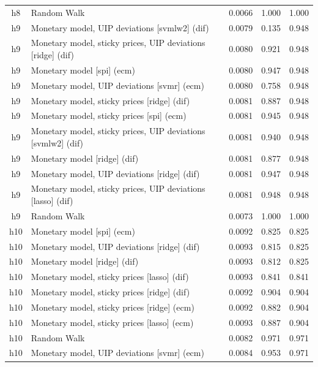 \begin{ThreePartTable}
\begin{longtable}[t]{cp{5.5cm}ccc}
h8 & \raggedright Random Walk & 0.0066 & 1.000 & 1.000\\
\addlinespace
h9 & \raggedright Monetary model, UIP deviations [svmlw2] (dif) & 0.0079 & 0.135 & 0.948\\
h9 & \raggedright Monetary model, sticky prices, UIP deviations [ridge] (dif) & 0.0080 & 0.921 & 0.948\\
h9 & \raggedright Monetary model [spi] (ecm) & 0.0080 & 0.947 & 0.948\\
h9 & \raggedright Monetary model, UIP deviations [svmr] (ecm) & 0.0080 & 0.758 & 0.948\\
h9 & \raggedright Monetary model, sticky prices [ridge] (dif) & 0.0081 & 0.887 & 0.948\\
h9 & \raggedright Monetary model, sticky prices [spi] (ecm) & 0.0081 & 0.945 & 0.948\\
h9 & \raggedright Monetary model, sticky prices, UIP deviations [svmlw2] (dif) & 0.0081 & 0.940 & 0.948\\
h9 & \raggedright Monetary model [ridge] (dif) & 0.0081 & 0.877 & 0.948\\
h9 & \raggedright Monetary model, UIP deviations [ridge] (dif) & 0.0081 & 0.947 & 0.948\\
h9 & \raggedright Monetary model, sticky prices, UIP deviations [lasso] (dif) & 0.0081 & 0.948 & 0.948\\
h9 & \raggedright Random Walk & 0.0073 & 1.000 & 1.000\\
\addlinespace
h10 & \raggedright Monetary model [spi] (ecm) & 0.0092 & 0.825 & 0.825\\
h10 & \raggedright Monetary model, UIP deviations [ridge] (dif) & 0.0093 & 0.815 & 0.825\\
h10 & \raggedright Monetary model [ridge] (dif) & 0.0093 & 0.812 & 0.825\\
h10 & \raggedright Monetary model, sticky prices [lasso] (dif) & 0.0093 & 0.841 & 0.841\\
h10 & \raggedright Monetary model, sticky prices [ridge] (dif) & 0.0092 & 0.904 & 0.904\\
h10 & \raggedright Monetary model, sticky prices [ridge] (ecm) & 0.0092 & 0.882 & 0.904\\
h10 & \raggedright Monetary model, sticky prices [lasso] (ecm) & 0.0093 & 0.887 & 0.904\\
h10 & \raggedright Random Walk & 0.0082 & 0.971 & 0.971\\
h10 & \raggedright Monetary model, UIP deviations [svmr] (ecm) & 0.0084 & 0.953 & 0.971\\

\end{longtable}
\end{ThreePartTable}
